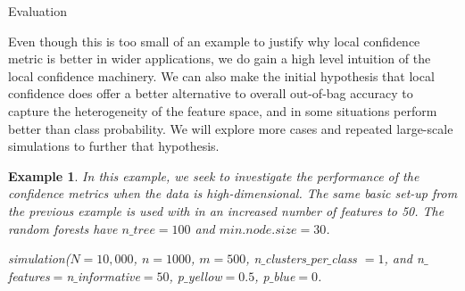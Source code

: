 \documentclass[12pt]{pom_thesis}
\newtheorem{example}{Example}[section]
\begin{document}
\begin{chapter}{Evaluation}


Even though this is too small of an example to justify why local confidence metric is better in wider applications, we do gain a high level intuition of the local confidence machinery. We can also make the initial hypothesis that local confidence does offer a better alternative to overall out-of-bag accuracy to capture the heterogeneity of the feature space, and in some situations perform better than class probability. We will explore more cases and repeated large-scale simulations to further that hypothesis.

\begin{example}
\label{example2}
In this example, we seek to investigate the performance of the confidence metrics when the data is high-dimensional. The same basic set-up from the previous example is used with in an increased number of features to 50. The random forests have $n\_tree = 100$ and $min.node.size = 30$.

simulation($N=10,000$, $n=1000$, $m=500$, n$\_$clusters$\_$per$\_$class $= 1$, and n$\_$features$=$n$\_$informative$=50$, p$\_$yellow$=0.5$, p$\_$blue$=0$.
\end{example}


\end{chapter}
\end{document}
